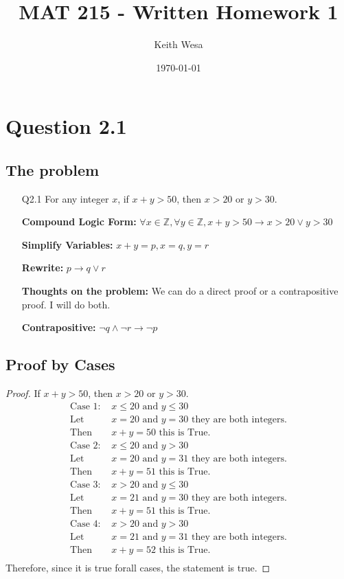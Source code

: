 \documentclass{article}
\author{Keith Wesa}
\title{MAT 215 - Written Homework 1}
\date{\today}
\begin{document}
\section*{Question 2.1}
\subsection*{The problem}
\begin{itemize}
    \item[Q2.1] For any integer $x$, if $x+y > 50$, then $x > 20$ or $y > 30$.
    \item[] \textbf{Compound Logic Form: } $\forall x \in \mathbb{Z}, \forall y \in \mathbb{Z}, x+y > 50 \rightarrow x > 20 \lor y > 30$
    \item[] \textbf{Simplify Variables: } $x+y = p, x = q, y = r$
    \item[] \textbf{Rewrite: } $p \rightarrow q \lor r$
    \item[] \textbf{Thoughts on the problem:} We can do a direct proof or a contrapositive proof. I will do both.
    \item[] \textbf{Contrapositive: } $\neg q \land \neg r \rightarrow \neg p$
\end{itemize}
\subsection*{Proof by Cases}
\begin{proof}
    If $x+y > 50$, then $x > 20$ or $y > 30$.  
    \begin{align*}
        \text{Case 1: } & x \leq 20 \text{ and } y \leq 30 \\
        \text{Let } & x = 20 \text{ and } y = 30 \text{ they are both integers.} \\
        \text{Then } & x+y = 50 \text{ this is True.}\\
        \text{Case 2: } & x \leq 20 \text{ and } y > 30 \\
        \text{Let } & x = 20 \text{ and } y = 31 \text{ they are both integers.} \\
        \text{Then } & x+y = 51 \text{ this is True.}\\
        \text{Case 3: } & x > 20 \text{ and } y \leq 30 \\
        \text{Let } & x = 21 \text{ and } y = 30 \text{ they are both integers.} \\
        \text{Then } & x+y = 51 \text{ this is True.}\\
        \text{Case 4: } & x > 20 \text{ and } y > 30 \\
        \text{Let } & x = 21 \text{ and } y = 31 \text{ they are both integers.} \\
        \text{Then } & x+y = 52 \text{ this is True.}\\
        \end{align*}
    Therefore, since it is true forall cases, the statement is true.
\end{proof}
\end{document}
